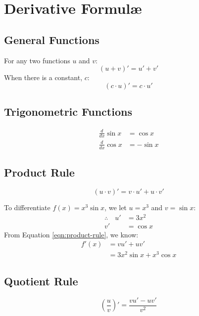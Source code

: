 \documentclass[../main.tex]{subfiles}
\begin{document}
\chapter{Derivative Formulæ}
\section{General Functions}
For any two functions $u$ and $v$:
\[ (u + v)' = u' + v' \]
When there is a constant, $c$:
\[ (c \cdot u)' = c \cdot u' \]
\section{Trigonometric Functions}
\begin{align*}
    \frac{d}{dx} \sin x &= \cos x\\
    \frac{d}{dx} \cos x &= - \sin x
\end{align*}
\section{Product Rule}
\begin{equation}
    (u \cdot v)' = v \cdot u' + u \cdot v'
    \label{eqn:product-rule}
\end{equation}
\begin{exmp}
    To differentiate $f(x) = x^3 \sin x$, we let 
    $u = x^3$ and $v = \sin x$:
    \begin{align*}
        \therefore \quad u' &= 3x^2\\
                         v' &= \cos x
    \end{align*}
    From Equation \ref{eqn:product-rule}, we know:
    \begin{align*}
        f'(x)   &= vu' + uv'\\
                &= 3x^2 \sin x + x^3 \cos x
    \end{align*}
\end{exmp}
\section{Quotient Rule}
\[ \left( \frac{u}{v} \right)' = \frac{vu' - uv'}{v^2} \]
\end{document}
